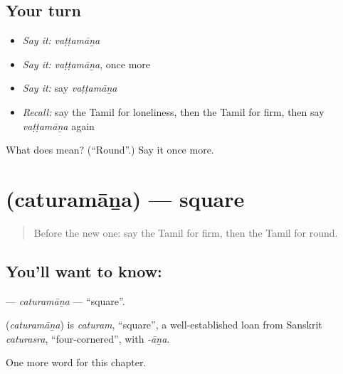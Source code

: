 \subsection*{Your turn}
\begin{itemize}
\raggedright
  \item \emph{Say it:} \emph{vaṭṭamāṉa}
  \item \emph{Say it:} \emph{vaṭṭamāṉa}, once more
  \item \emph{Say it:} say \emph{vaṭṭamāṉa}
  \item \emph{Recall:} say the Tamil for loneliness, then the Tamil for firm, then say \emph{vaṭṭamāṉa} again
\end{itemize}

\begin{tcolorbox}[breakable,colback=teal!4,colframe=teal!35!black,title={Before you move on}]
What does  mean? (\textquotedblleft{}Round\textquotedblright{}.) Say it once more.
\end{tcolorbox}
\section[\texorpdfstring{\ta{சதுரமான} (caturamāṉa)}{சதுரமான (caturamāṉa)}]{ (caturamāṉa) — square}

\label{lesson:TA-C240-caturamana}



\begin{quote}
Before the new one: say the Tamil for firm, then the Tamil for round.
\end{quote}

\subsection*{You'll want to know: }
\textbf{} — \emph{caturamāṉa} — \textquotedblleft{}square\textquotedblright{}.

\begin{cousinweb}
\textbf{} (\emph{caturamāṉa}) is \emph{caturam}, \textquotedblleft{}square\textquotedblright{}, a well-established loan from Sanskrit \emph{caturasra}, \textquotedblleft{}four-cornered\textquotedblright{}, with \emph{-āṉa}.
\end{cousinweb}

\begin{grammarlens}[title={What you've built}]
One more word for this chapter.
\end{grammarlens}

